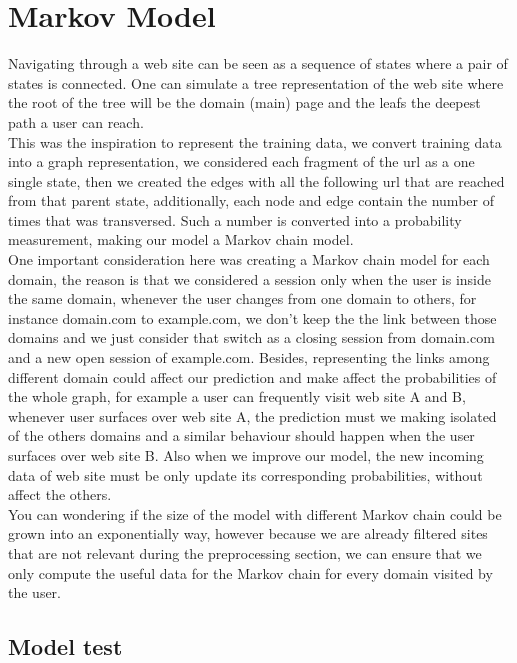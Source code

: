 \section{Markov Model}\label{sec:models}

Navigating through a web site can be seen as a sequence of states where a pair of states is connected. One can simulate a tree representation of the web site where the root of the tree will be the domain (main) page and the leafs the deepest path a user can reach.
\\[2ex]
This was the inspiration to represent the training data, we convert training data into a graph representation, we considered each fragment of the url as a one single state, then we created the edges with all the following url that are reached from that parent state, additionally, each node and edge contain the number of times that was transversed.  Such a number is converted into a probability measurement, making our model a Markov chain model.
\\[2ex]
One important consideration here was creating a Markov chain model for each domain, the reason is that we considered a session only when the user is inside the same domain, whenever the user changes from one domain to others, for instance domain.com to example.com, we don’t keep the the link between those domains and we just consider that switch as a closing session from domain.com and a new open session of example.com. Besides, representing the links among different domain could affect our prediction and make affect the probabilities of the whole graph, for example a user can frequently visit web site A and B, whenever user surfaces over web site A, the prediction must we making isolated of the others domains and a similar behaviour should happen when the user surfaces over web site B. Also when we improve our model, the new incoming data of web site must be only update its corresponding probabilities, without affect the others.
\\[2ex]
You can wondering if the size of the model with different Markov chain could be grown into an exponentially way, however because we are already filtered sites that are not relevant during the preprocessing section, we can ensure that we only compute the useful data for the Markov chain for every domain visited by the user.

\subsection{Model test}\label{subsec:model_test}

